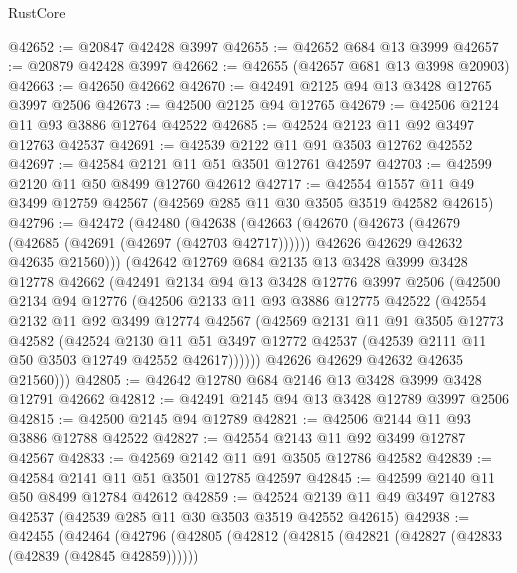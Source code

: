 \begin{lexlean}{RustCore}
\begin{coremodule}
@42652 := @20847 @42428 @3997
@42655 := @42652 @684 @13 @3999
@42657 := @20879 @42428 @3997
@42662 := @42655 (@42657 @681 @13 @3998 @20903)
@42663 := @42650 @42662
@42670 := @42491 @2125 @94 @13 @3428 @12765 @3997 @2506
@42673 := @42500 @2125 @94 @12765
@42679 := @42506 @2124 @11 @93 @3886 @12764 @42522
@42685 := @42524 @2123 @11 @92 @3497 @12763 @42537
@42691 := @42539 @2122 @11 @91 @3503 @12762 @42552
@42697 := @42584 @2121 @11 @51 @3501 @12761 @42597
@42703 := @42599 @2120 @11 @50 @8499 @12760 @42612
@42717 := @42554 @1557 @11 @49 @3499 @12759 @42567 (@42569 @285 @11 @30 @3505 @3519 @42582 @42615)
@42796 := @42472
    (@42480
      (@42638
        (@42663
          (@42670
            (@42673 (@42679 (@42685 (@42691 (@42697 (@42703 @42717))))))
            @42626
            @42629
            @42632
            @42635
            @21560)))
      (@42642
        @12769
        @684
        @2135
        @13
        @3428
        @3999
        @3428
        @12778
        @42662
        (@42491
          @2134
          @94
          @13
          @3428
          @12776
          @3997
          @2506
          (@42500
            @2134
            @94
            @12776
            (@42506
              @2133
              @11
              @93
              @3886
              @12775
              @42522
              (@42554
                @2132
                @11
                @92
                @3499
                @12774
                @42567
                (@42569
                  @2131
                  @11
                  @91
                  @3505
                  @12773
                  @42582
                  (@42524
                    @2130
                    @11
                    @51
                    @3497
                    @12772
                    @42537
                    (@42539 @2111 @11 @50 @3503 @12749 @42552 @42617))))))
          @42626
          @42629
          @42632
          @42635
          @21560)))
@42805 := @42642 @12780 @684 @2146 @13 @3428 @3999 @3428 @12791 @42662
@42812 := @42491 @2145 @94 @13 @3428 @12789 @3997 @2506
@42815 := @42500 @2145 @94 @12789
@42821 := @42506 @2144 @11 @93 @3886 @12788 @42522
@42827 := @42554 @2143 @11 @92 @3499 @12787 @42567
@42833 := @42569 @2142 @11 @91 @3505 @12786 @42582
@42839 := @42584 @2141 @11 @51 @3501 @12785 @42597
@42845 := @42599 @2140 @11 @50 @8499 @12784 @42612
@42859 := @42524 @2139 @11 @49 @3497 @12783 @42537 (@42539 @285 @11 @30 @3503 @3519 @42552 @42615)
@42938 := @42455
    (@42464
      (@42796
        (@42805
          (@42812
            (@42815 (@42821 (@42827 (@42833 (@42839 (@42845 @42859))))))

\end{coremodule}
\end{lexlean}
